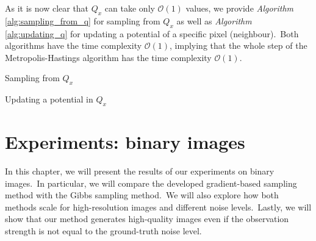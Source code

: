 \documentclass[a4paper, 11pt, onecolumn, openany, titlepage]{report}
\newcommand\numberedchapter[1]{\setlength\topskip{3cm}\chapter{#1}\setlength\topskip{0cm}}
\theoremstyle{default_theorem_style}\newtheorem{theorem}{Theorem}
\theoremstyle{default_theorem_style}\newtheorem{definition}{Definition}
\begin{document}
As it is now clear that $Q_x$ can take only $\mathcal{O}(1)$ values, we provide \textit{Algorithm}
\ref{alg:sampling_from_q} for sampling from $Q_x$ as well as \textit{Algorithm} \ref{alg:updating_q} for
updating a potential of a specific pixel (neighbour).\ Both algorithms have the time complexity
$\mathcal{O}(1)$, implying that the whole step of the Metropolis-Hastings algorithm has the time
complexity $\mathcal{O}(1)$.\newline

\begin{algorithm}[H]
\caption{Sampling from $Q_x$}\label{alg:sampling_from_q}
\begin{algorithmic}[1]
\end{algorithmic}
\end{algorithm}

\begin{algorithm}[H]
\caption{Updating a potential in $Q_x$}\label{alg:updating_q}
\begin{algorithmic}[1]
\EndIf
{}
\end{algorithmic}
\end{algorithm}

\numberedchapter{Experiments: binary images}

In this chapter, we will present the results of our experiments on binary images.\ In particular, we will compare
the developed gradient-based sampling method with the Gibbs sampling method.\ We will also explore how both methods
scale for high-resolution images and different noise levels.\ Lastly, we will show that our method
generates high-quality images even if the observation strength is not equal to the ground-truth noise level.
\end{document}
